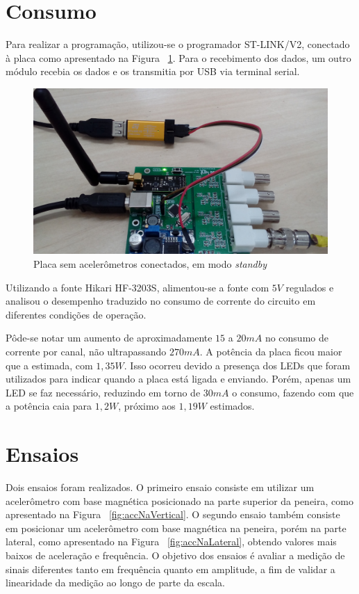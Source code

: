 \documentclass[
	12pt,				%
	openright,			%
	twoside,			%
	a4paper,			%
	english,			%
	french,				%
	spanish,			%
	brazil,				%
	]{abntex2}
\begin{document}
			\newpage

	\section{Consumo}
		Para realizar a programação, utilizou-se o programador
		ST-LINK/V2, conectado à placa como apresentado na Figura ~\ref{fig:accConectados}. Para
		o recebimento dos dados, um outro módulo recebia os dados e
		os transmitia por USB via terminal serial.

		\begin{figure}[!ht]
			\centering
			\includegraphics[width=\linewidth]{../Fotos/stlink.jpg}
			\caption{Placa sem acelerômetros conectados, em modo \textit{standby}}
			\label{fig:accConectados}
		\end{figure}

		Utilizando a fonte Hikari HF-3203S, alimentou-se a fonte com $5V$
		regulados e analisou o desempenho traduzido no consumo de
		corrente do circuito em diferentes condições de operação.

		Pôde-se notar um aumento de aproximadamente $15$ a $20mA$ no consumo
		de corrente por canal, não ultrapassando $270mA$. A potência da
		placa ficou maior que a estimada, com $1,35W$. Isso ocorreu devido
		a presença dos LEDs que foram utilizados para indicar quando a
		placa está ligada e enviando. Porém, apenas um LED se faz
		necessário, reduzindo em torno de $30mA$ o consumo, fazendo com
		que a potência caia para $1,2W$, próximo aos $1,19W$ estimados.

		\newpage

	\section{Ensaios}
		Dois ensaios foram realizados. O primeiro ensaio consiste em utilizar um acelerômetro com base magnética posicionado na parte superior da peneira, como apresentado na Figura ~\ref{fig:accNaVertical}. O segundo ensaio também consiste em posicionar um acelerômetro com base magnética na peneira, porém na parte lateral, como apresentado na Figura ~\ref{fig:accNaLateral}, obtendo valores mais baixos de aceleração e frequência. O objetivo dos ensaios é avaliar a medição de sinais diferentes tanto em frequência quanto em amplitude, a fim de validar a linearidade da medição ao longo de parte da escala.
		
\end{document}

